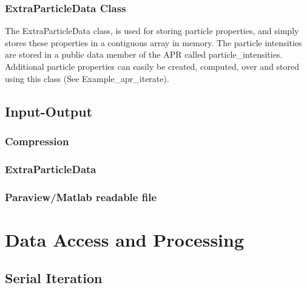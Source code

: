 \documentclass[12pt]{article}
\begin{document}
\subsubsection{ExtraParticleData Class}
The ExtraParticleData class, is used for storing particle properties, and simply stores these properties in a contiguous array in memory. The particle intensities are stored in a public data member of the APR called particle\_intensities. Additional particle properties can easily be created, computed, over and stored using this class (See Example\_apr\_iterate).
\subsection{Input-Output}

\subsubsection{Compression}

\subsubsection{ExtraParticleData}

\subsubsection{Paraview/Matlab readable file}

\section{Data Access and Processing}


\subsection{Serial Iteration}
\end{document}
